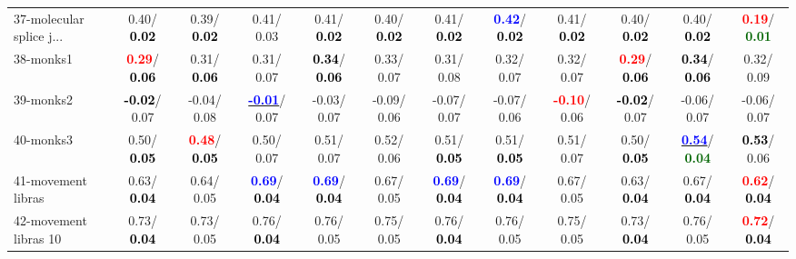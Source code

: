 \begin{table}[h]
\begin{center}
{\begin{tabular}{lc|c|c|c|c|c|c|c|c|c|c}
37-molecular splice j... &   0.40/\textcolor{black}{\textbf{  0.02}} &   0.39/\textcolor{black}{\textbf{  0.02}} &   0.41/  0.03 &   0.41/\textcolor{black}{\textbf{  0.02}} &   0.40/\textcolor{black}{\textbf{  0.02}} &   0.41/\textcolor{black}{\textbf{  0.02}} & \textcolor{blue}{\textbf{  0.42}}/\textcolor{black}{\textbf{  0.02}} &   0.41/\textcolor{black}{\textbf{  0.02}} &   0.40/\textcolor{black}{\textbf{  0.02}} &   0.40/\textcolor{black}{\textbf{  0.02}} & \textcolor{red}{\textbf{  0.19}}/\textcolor{darkgreen}{\textbf{  0.01}} \\
38-monks1 & \textcolor{red}{\textbf{  0.29}}/\textcolor{black}{\textbf{  0.06}} &   0.31/\textcolor{black}{\textbf{  0.06}} &   0.31/  0.07 & \textcolor{black}{\textbf{  0.34}}/\textcolor{black}{\textbf{  0.06}} &   0.33/  0.07 &   0.31/  0.08 &   0.32/  0.07 &   0.32/  0.07 & \textcolor{red}{\textbf{  0.29}}/\textcolor{black}{\textbf{  0.06}} & \textcolor{black}{\textbf{  0.34}}/\textcolor{black}{\textbf{  0.06}} &   0.32/  0.09 \\
39-monks2 & \textcolor{black}{\textbf{ -0.02}}/  0.07 &  -0.04/  0.08 & \underline{\textcolor{blue}{\textbf{ -0.01}}}/  0.07 &  -0.03/  0.07 &  -0.09/  0.06 &  -0.07/  0.07 &  -0.07/  0.06 & \textcolor{red}{\textbf{ -0.10}}/  0.06 & \textcolor{black}{\textbf{ -0.02}}/  0.07 &  -0.06/  0.07 &  -0.06/  0.07 \\ \hline
40-monks3 &   0.50/\textcolor{black}{\textbf{  0.05}} & \textcolor{red}{\textbf{  0.48}}/\textcolor{black}{\textbf{  0.05}} &   0.50/  0.07 &   0.51/  0.07 &   0.52/  0.06 &   0.51/\textcolor{black}{\textbf{  0.05}} &   0.51/\textcolor{black}{\textbf{  0.05}} &   0.51/  0.07 &   0.50/\textcolor{black}{\textbf{  0.05}} & \underline{\textcolor{blue}{\textbf{  0.54}}}/\textcolor{darkgreen}{\textbf{  0.04}} & \textcolor{black}{\textbf{  0.53}}/  0.06 \\
41-movement libras &   0.63/\textcolor{black}{\textbf{  0.04}} &   0.64/  0.05 & \textcolor{blue}{\textbf{  0.69}}/\textcolor{black}{\textbf{  0.04}} & \textcolor{blue}{\textbf{  0.69}}/\textcolor{black}{\textbf{  0.04}} &   0.67/  0.05 & \textcolor{blue}{\textbf{  0.69}}/\textcolor{black}{\textbf{  0.04}} & \textcolor{blue}{\textbf{  0.69}}/\textcolor{black}{\textbf{  0.04}} &   0.67/  0.05 &   0.63/\textcolor{black}{\textbf{  0.04}} &   0.67/\textcolor{black}{\textbf{  0.04}} & \textcolor{red}{\textbf{  0.62}}/\textcolor{black}{\textbf{  0.04}} \\
42-movement libras 10 &   0.73/\textcolor{black}{\textbf{  0.04}} &   0.73/  0.05 &   0.76/\textcolor{black}{\textbf{  0.04}} &   0.76/  0.05 &   0.75/  0.05 &   0.76/\textcolor{black}{\textbf{  0.04}} &   0.76/  0.05 &   0.75/  0.05 &   0.73/\textcolor{black}{\textbf{  0.04}} &   0.76/  0.05 & \textcolor{red}{\textbf{  0.72}}/\textcolor{black}{\textbf{  0.04}} \\

\end{tabular}}
\end{center}
\end{table}
